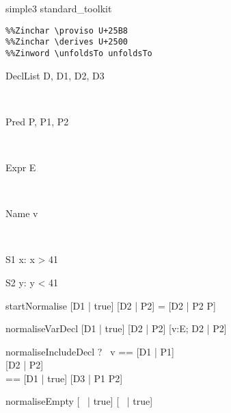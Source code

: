 \begin{zsection}
\SECTION simple3 \parents standard\_toolkit
\end{zsection}

\begin{verbatim}
%%Zinchar \proviso U+25B8
%%Zinchar \derives U+2500
%%Zinword \unfoldsTo unfoldsTo
\end{verbatim}
\newcommand{\unfoldsTo}{\mathrel{\leadsto}}

\begin{zedjoker}{DeclList} D, D1, D2, D3\end{zedjoker} \\
\begin{zedjoker}{Pred} P, P1, P2\end{zedjoker} \\
\begin{zedjoker}{Expr} E\end{zedjoker} \\
\begin{zedjoker}{Name} v\end{zedjoker} \\

\begin{schema}{S1}
  x:\nat
\where
  x > 41
\end{schema}

\begin{schema}{S2}
  y:\nat
\where
  y < 41
\end{schema}

\begin{zedrule}{startNormalise}
   [D1 | true] \unfoldsTo [D2 | P2]
\derives
   [D1 | P] = [D2 | P2 \land P]
\end{zedrule}

\begin{zedrule}{normaliseVarDecl}
   [D1 | true] \unfoldsTo [D2 | P2]
\derives
   [v:E; D1 | true] \unfoldsTo [v:E; D2 | P2]
\end{zedrule}

\begin{zedrule}{normaliseIncludeDecl}
   \proviso ?~ v == [D1 | P1] \\
   [D | true] \unfoldsTo [D2 | P2] \\
   \proviso [D3 | true] == [D1 | true] \schemamerge [D2 | true]
\derives
   [v; D | true] \unfoldsTo [D3 | P1 \land P2]
\end{zedrule}

\begin{zedrule}{normaliseEmpty}
   [~ | true] \unfoldsTo [~ | true]
\end{zedrule}

